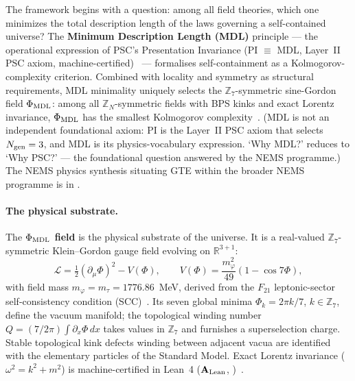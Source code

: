 The framework begins with a question: among all field theories, which one minimizes
the total description length of the laws governing a self-contained universe?
The \textbf{Minimum Description Length (MDL)} principle --- the operational
expression of PSC's Presentation Invariance (PI $\equiv$ MDL, Layer~II PSC axiom,
machine-certified)~\cite{SpivackSM} --- formalises self-containment as a
Kolmogorov-complexity criterion.
Combined with locality and symmetry as structural requirements, MDL minimality
uniquely selects the $\mathbb{Z}_7$-symmetric sine-Gordon field $\Phi_{\rm MDL}$:
among all $\mathbb{Z}_N$-symmetric fields with BPS kinks and exact Lorentz invariance,
$\Phi_{\rm MDL}$ has the smallest Kolmogorov complexity~\cite{SpivackCMCA,SpivackPhiMDLField}.
(MDL is not an independent foundational axiom: PI is the Layer~II PSC axiom that
selects $N_{\rm gen}=3$, and MDL is its physics-vocabulary expression.  `Why MDL?'
reduces to `Why PSC?' --- the foundational question answered by the NEMS programme.)
The NEMS physics synthesis situating GTE within the broader NEMS programme is in \cite{SpivackPhysicsPortal}.

\paragraph{The physical substrate.}
The \textbf{$\Phi_{\rm MDL}$ field} is the physical substrate of the universe.
It is a real-valued $\mathbb{Z}_7$-symmetric Klein--Gordon gauge field evolving on
$\mathbb{R}^{3+1}$:
\[
  \mathcal{L} = \tfrac{1}{2}(\partial_\mu\Phi)^2 - V(\Phi),
  \qquad
  V(\Phi) = \frac{m_\varphi^2}{49}(1-\cos 7\Phi),
\]
with field mass $m_\varphi = m_\tau = 1776.86$~MeV, derived from the $F_{21}$
leptonic-sector self-consistency condition (SCC)~\cite{SpivackCompleteness}.
Its seven global minima $\Phi_k = 2\pi k/7$, $k \in \mathbb{Z}_7$, define the
vacuum manifold; the topological winding number $Q = (7/2\pi)\int\partial_x\Phi\,dx$
takes values in $\mathbb{Z}_7$ and furnishes a superselection charge.
Stable topological kink defects winding between adjacent vacua are identified with
the elementary particles of the Standard Model.  Exact Lorentz invariance
($\omega^2 = k^2 + m^2$) is machine-certified in Lean~4
($\mathbf{A}_{\rm Lean}$, )~\cite{SpivackPhiMDLField}.

